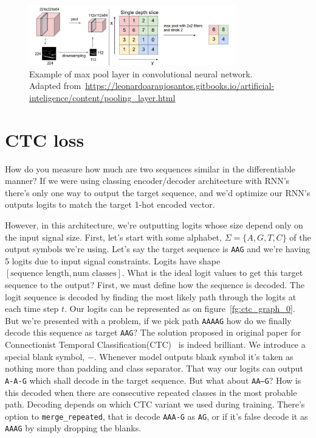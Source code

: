 \documentclass[times, utf8, diplomski, english]{fer}
\begin{document}
\begin{figure}
    \begin{center}
        \includegraphics[width=0.8\textwidth]{Pooling_Simple_max}
        \caption{Example of max pool layer in convolutional neural network. Adapted from~\url{https://leonardoaraujosantos.gitbooks.io/artificial-inteligence/content/pooling_layer.html}}
        \label{fg:maxpool}
    \end{center}
\end{figure}

\section{CTC loss}
\label{sec:ctc_loss}

How do you measure how much are two sequences similar in the differentiable manner? If we were using classing encoder/decoder architecture with RNN's there's only one way to output the target sequence, and we'd optimize our RNN's outputs logits to match the target 1-hot encoded vector. 

However, in this architecture, we're outputting logits whose size depend only on the input signal size. First, let's start with some alphabet, $\Sigma = \{A, G, T, C\}$ of the output symbols we're using.  
Let's say the target sequence is \texttt{AAG} and we're having 5 logits due to input signal constraints. 
Logits have shape $[\text{sequence length}, \text{num classes}]$. 
What is the ideal logit values to get this target sequence to the output? 
First, we must define how the sequence is decoded. 
The logit sequence is decoded by finding the most likely path through the logits at each time step $t$. Our logits can be represented as on figure~\ref{fg:ctc_graph_0}.
But we're presented with a problem, if we pick path \texttt{AAAAG} how do we finally decode this sequence as target \texttt{AAG}? The solution proposed in original paper for Connectionist Temporal Classification(CTC)~\citep{Graves:2006:CTC:1143844.1143891, ctc-blog} is indeed brilliant. 
We introduce a special blank symbol, $-$. Whenever model outputs blank symbol it's taken as nothing more than padding and class separator. 
That way our logits can output \texttt{A-A-G} which shall decode in the target sequence.
But what about \texttt{AA--G}? How is this decoded when there are consecutive repeated classes in the most probable path. 
Decoding depends on which CTC variant we used during training. There's option to \texttt{merge\_repeated}, that is decode \texttt{AAA-G} as \texttt{AG}, or if it's false decode it as \texttt{AAAG} by simply dropping the blanks. 
\end{document}
